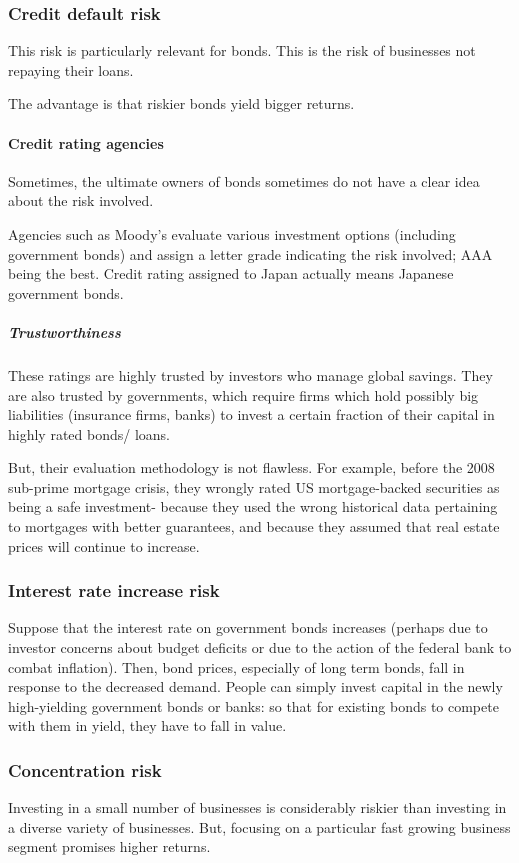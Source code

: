 \documentclass[oneside, article]{memoir}
\begin{document}
\subsubsection{Credit default risk}
This risk is particularly relevant for bonds. This is the risk of businesses not repaying their loans.

The advantage is that riskier bonds yield bigger returns.

\paragraph{Credit rating agencies}
Sometimes, the ultimate owners of bonds sometimes do not have a clear idea about the risk involved.

Agencies such as Moody's evaluate various investment options (including government bonds) and assign a letter grade indicating the risk involved; AAA being the best. Credit rating assigned to Japan actually means Japanese government bonds.

\subparagraph{Trustworthiness}
These ratings are highly trusted by investors who manage global savings. They are also trusted by governments, which require firms which hold possibly big liabilities (insurance firms, banks) to invest a certain fraction of their capital in highly rated bonds/ loans.

But, their evaluation methodology is not flawless. For example, before the 2008 sub-prime mortgage crisis, they wrongly rated US mortgage-backed securities as being a safe investment- because they used the wrong historical data pertaining to mortgages with better guarantees, and because they assumed that real estate prices will continue to increase.

\subsubsection{Interest rate increase risk}
Suppose that the interest rate on government bonds increases (perhaps due to investor concerns about budget deficits or due to the action of the federal bank to combat inflation). Then, bond prices, especially of long term bonds, fall in response to the decreased demand. People can simply invest capital in the newly high-yielding government bonds or banks: so that for existing bonds to compete with them in yield, they have to fall in value.

\subsubsection{Concentration risk}
Investing in a small number of businesses is considerably riskier than investing in a diverse variety of businesses. But, focusing on a particular fast growing business segment promises higher returns.
\end{document}
